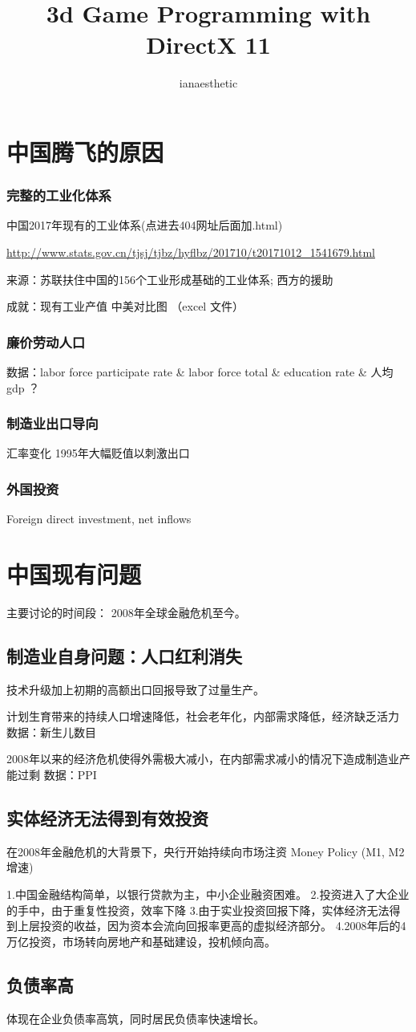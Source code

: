 \documentclass[10pt, a4paper]{article}
\author{ianaesthetic}
\title{3d Game Programming with DirectX 11}
\begin{document}
    \section{中国腾飞的原因}
        \subsubsection{完整的工业化体系}
            中国2017年现有的工业体系(点进去404网址后面加.html)

            \url{http://www.stats.gov.cn/tjsj/tjbz/hyflbz/201710/t20171012_1541679.html}
    
            来源：苏联扶住中国的156个工业形成基础的工业体系; 西方的援助
            
            成就：现有工业产值 中美对比图 （excel 文件）
        \subsubsection{廉价劳动人口}
            数据：labor force participate rate \& labor force total \& education rate \& 人均gdp ？ 

        \subsubsection{制造业出口导向}
            汇率变化 1995年大幅贬值以刺激出口
        \subsubsection{外国投资}
            Foreign direct investment, net inflows
\section{中国现有问题}    

    主要讨论的时间段： 2008年全球金融危机至今。

    \subsection{制造业自身问题：人口红利消失}

        技术升级加上初期的高额出口回报导致了过量生产。

        计划生育带来的持续人口增速降低，社会老年化，内部需求降低，经济缺乏活力
        数据：新生儿数目

        2008年以来的经济危机使得外需极大减小，在内部需求减小的情况下造成制造业产能过剩 
        数据：PPI

    \subsection{实体经济无法得到有效投资}
        在2008年金融危机的大背景下，央行开始持续向市场注资 Money Policy (M1, M2增速)

        1.中国金融结构简单，以银行贷款为主，中小企业融资困难。
        2.投资进入了大企业的手中，由于重复性投资，效率下降
        3.由于实业投资回报下降，实体经济无法得到上层投资的收益，因为资本会流向回报率更高的虚拟经济部分。
        4.2008年后的4万亿投资，市场转向房地产和基础建设，投机倾向高。
        
    \subsection{负债率高}
        体现在企业负债率高筑，同时居民负债率快速增长。 
        
\end{document}
